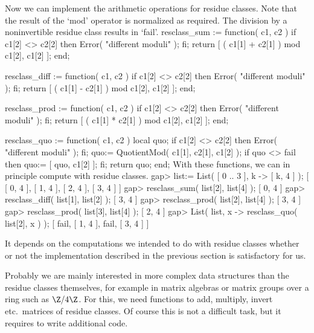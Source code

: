 Now we can implement the arithmetic operations for residue classes.
Note that the result of the `mod' operator is normalized as required.
The division by a noninvertible residue class results in `fail'.
\begintt
resclass_sum := function( c1, c2 )
    if c1[2] <> c2[2] then Error( "different moduli" ); fi;
    return [ ( c1[1] + c2[1] ) mod c1[2], c1[2] ];
end;

resclass_diff := function( c1, c2 )
    if c1[2] <> c2[2] then Error( "different moduli" ); fi;
    return [ ( c1[1] - c2[1] ) mod c1[2], c1[2] ];
end;

resclass_prod := function( c1, c2 )
    if c1[2] <> c2[2] then Error( "different moduli" ); fi;
    return [ ( c1[1] * c2[1] ) mod c1[2], c1[2] ];
end;

resclass_quo := function( c1, c2 )
    local quo;
    if c1[2] <> c2[2] then Error( "different moduli" ); fi;
    quo:= QuotientMod( c1[1], c2[1], c1[2] );
    if quo <> fail then
      quo:= [ quo, c1[2] ];
    fi;
    return quo;
end;
\endtt
With these functions, we can in principle compute with residue classes.
\begintt
gap> list:= List( [ 0 .. 3 ], k -> [ k, 4 ] );
[ [ 0, 4 ], [ 1, 4 ], [ 2, 4 ], [ 3, 4 ] ]
gap> resclass_sum( list[2], list[4] );
[ 0, 4 ]
gap> resclass_diff( list[1], list[2] );
[ 3, 4 ]
gap> resclass_prod( list[2], list[4] );
[ 3, 4 ]
gap> resclass_prod( list[3], list[4] );
[ 2, 4 ]
gap> List( list, x -> resclass_quo( list[2], x ) );
[ fail, [ 1, 4 ], fail, [ 3, 4 ] ]
\endtt



It depends on the computations we intended to do with residue classes
whether or not the implementation described in the previous section
is satisfactory for us.

Probably we are mainly interested in more complex data structures than
the residue classes themselves, for example in matrix algebras or matrix
groups over a ring such as $\Z/4\Z$.
For this, we need functions to add, multiply, invert etc.~matrices of
residue classes.
Of course this is not a difficult task, but it requires to write
additional {\GAP} code.

